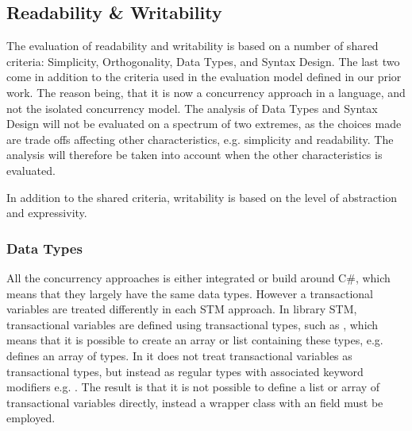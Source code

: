 \subsection{Readability \& Writability}\label{subsec:tl_charac_read_and_write}
The evaluation of readability and writability is based on a number of shared criteria: Simplicity, Orthogonality, Data Types, and Syntax Design. The last two come in addition to the criteria used in the evaluation model defined in our prior work\cite[p. 16-21]{dpt907e14trending}. The reason being, that it is now a concurrency approach in a language, and not the isolated concurrency model. The analysis of Data Types and Syntax Design will not be evaluated on a spectrum of two extremes, as the choices made are trade offs affecting other characteristics, e.g. simplicity and readability. The analysis will therefore be taken into account when the other characteristics is evaluated.

In addition to the shared criteria, writability is based on the level of abstraction and expressivity.
\subsubsection{Data Types}\label{subsec:datatypes}
All the concurrency approaches is either integrated or build around C\#, which means that they largely have the same data types. However a transactional variables are treated differently in each \ac{STM} approach. In library \ac{STM}, transactional variables are defined using transactional types, such as , which means that it is possible to create an array or list containing these types, e.g.  defines an array of  types. In \stmname it does not treat transactional variables as transactional types, but instead as regular types with associated  keyword modifiers e.g. . The result is that it is not possible to define a list or array of transactional variables directly, instead a wrapper class with an  field must be employed.

